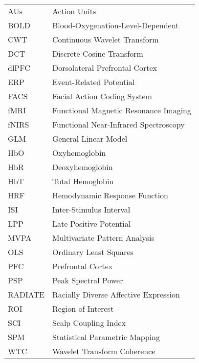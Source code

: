 \begin{longtable}{@{}p{3cm}p{10cm}@{}}
AUs & Action Units \\
BOLD & Blood-Oxygenation-Level-Dependent \\
CWT & Continuous Wavelet Transform \\
DCT & Discrete Cosine Transform \\
dlPFC & Dorsolateral Prefrontal Cortex \\
ERP & Event-Related Potential \\
FACS  & Facial Action Coding System \\
fMRI & Functional Magnetic Resonance Imaging \\
fNIRS & Functional Near-Infrared Spectroscopy \\
GLM & General Linear Model \\
HbO & Oxyhemoglobin \\
HbR & Deoxyhemoglobin \\
HbT & Total Hemoglobin \\
HRF & Hemodynamic Response Function \\
ISI & Inter-Stimulus Interval \\
LPP & Late Positive Potential \\
MVPA & Multivariate Pattern Analysis \\
OLS & Ordinary Least Squares \\
PFC & Prefrontal Cortex \\
PSP & Peak Spectral Power \\
RADIATE & Racially Diverse Affective Expression \\
ROI & Region of Interest \\
SCI & Scalp Coupling Index \\
SPM & Statistical Parametric Mapping \\
WTC & Wavelet Transform Coherence \\
\end{longtable}
